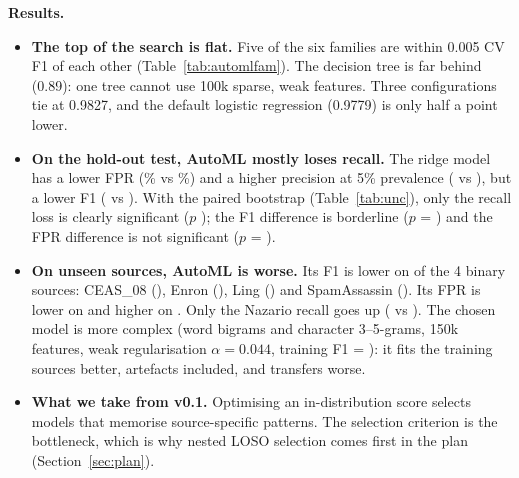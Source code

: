 \textbf{Results.}
\begin{itemize}
\item \textbf{The top of the search is flat.} Five of the six families are within 0.005 CV F1 of each other (Table~\ref{tab:automlfam}). The decision tree is far behind (0.89): one tree cannot use 100k sparse, weak features. Three configurations tie at 0.9827, and the default logistic regression (0.9779) is only half a point lower.
\item \textbf{On the hold-out test, AutoML mostly loses recall.} The ridge model has a lower FPR (\autoFPR\% vs \baseFPRtwo\%) and a higher precision at 5\% prevalence (\autoPrecFive{} vs \basePrecFive), but a lower F1 (\autoFone{} vs \baseFone). With the paired bootstrap (Table~\ref{tab:unc}), only the recall loss is clearly significant ($p$ \pDiffRecall); the F1 difference is borderline ($p$ = \pDiffFone) and the FPR difference is not significant ($p$ = \pDiffFPR).
\item \textbf{On unseen sources, AutoML is worse.} Its F1 is lower on \autoFoneWorse{} of the 4 binary sources: CEAS\_08 (\dFoneCeas), Enron (\dFoneEnron), Ling (\dFoneLing) and SpamAssassin (\dFoneSpam). Its FPR is lower on \autoFPRbetter{} and higher on \autoFPRworse. Only the Nazario recall goes up (\autoNazRecall{} vs \baseNazRecall). The chosen model is more complex (word bigrams and character 3--5-grams, 150k features, weak regularisation $\alpha=0.044$, training F1 = \autoTrainFone): it fits the training sources better, artefacts included, and transfers worse.
\item \textbf{What we take from v0.1.} Optimising an in-distribution score selects models that memorise source-specific patterns. The selection criterion is the bottleneck, which is why nested LOSO selection comes first in the plan (Section~\ref{sec:plan}).
\end{itemize}

